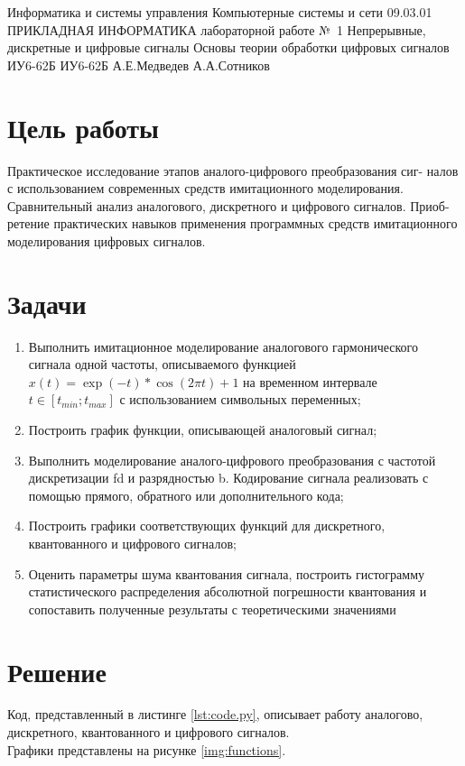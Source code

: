 \documentclass{bmstu}
\begin{document}
\makereporttitle
    {Информатика и системы управления} %
    {Компьютерные системы и сети} %
    {09.03.01 ПРИКЛАДНАЯ ИНФОРМАТИКА} %
    {лабораторной работе №~1} %
    {Непрерывные, дискретные и цифровые сигналы} %
    {Основы теории обработки цифровых сигналов} %
    {} %
    {ИУ6-62Б} %
    {
    	{ИУ6-62Б}
    	{А.Е.Медведев} %
    	{А.А.Сотников} %
    } 
    

\section*{Цель работы}
Практическое исследование этапов аналого-цифрового преобразования сиг-
налов с использованием современных средств имитационного моделирования.
Сравнительный анализ аналогового, дискретного и цифрового сигналов. Приоб-
ретение практических навыков применения программных средств имитационного
моделирования цифровых сигналов.

\section*{Задачи}
\begin{enumerate} 
\item Выполнить имитационное моделирование аналогового гармонического сигнала одной частоты, описываемого функцией $x(t) = \exp(-t) * \cos(2\pi t) + 1$ на временном интервале $t \in [t_{min} ; t_{max} ]$ с использованием символьных переменных;
\item Построить график функции, описывающей аналоговый сигнал;
\item Выполнить моделирование аналого-цифрового преобразования с частотой дискретизации fd и разрядностью b. Кодирование сигнала реализовать с помощью прямого, обратного или дополнительного кода;
\item Построить графики соответствующих функций для дискретного, квантованного и цифрового сигналов;
\item Оценить параметры шума квантования сигнала, построить гистограмму статистического распределения абсолютной погрешности квантования и сопоставить полученные результаты с теоретическими значениями
\end{enumerate}

\newpage

\section*{Решение}
Код, представленный в листинге \ref{lst:code.py}, описывает работу аналогово, дискретного, квантованного и цифрового сигналов. \\
Графики представлены на рисунке \ref{img:functions}.
\end{document}
